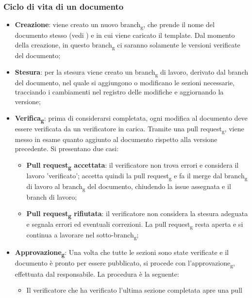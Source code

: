 \subsubsection{Ciclo di vita di un documento}
\begin{itemize}
      \item \textbf{Creazione}: viene creato un nuovo branch\textsubscript{g}, che prende il nome del documento stesso
            (vedi ) e in cui viene caricato il template. Dal momento della creazione, in questo
            branch\textsubscript{g} ci saranno solamente le versioni verificate del documento;
      \item \textbf{Stesura}: per la stesura viene creato un branch\textsubscript{g} di lavoro, derivato dal branch del documento, nel quale si aggiungono o modificano le
            sezioni necessarie, tracciando i cambiamenti nel registro delle modifiche e aggiornando la versione;
      \item \textbf{Verifica\textsubscript{g}}: prima di considerarsi completata, ogni modifica al documento deve essere verificata da un verificatore in carica.
            Tramite una pull request\textsubscript{g}, viene messo in esame quanto aggiunto al documento rispetto alla versione precedente. Si presentano due casi:
            \begin{itemize}
                  \item \textbf{Pull request\textsubscript{g} accettata}: il verificatore non trova errori e considera il lavoro 'verificato';
                   accetta quindi la pull request\textsubscript{g} e fa il merge dal branch\textsubscript{g} di lavoro al branch\textsubscript{g} del documento, chiudendo la issue assegnata e il branch di lavoro;
                  \item \textbf{Pull request\textsubscript{g} rifiutata}: il verificatore non considera la stesura adeguata e segnala errori 
                  ed eventuali correzioni. La pull request\textsubscript{g} resta aperta e si continua a lavorare nel sotto-branch\textsubscript{g};
            \end{itemize}
      \item \textbf{Approvazione\textsubscript{g}}: Una volta che tutte le sezioni sono state verificate e il documento è pronto per essere pubblicato,
            si procede con l'approvazione\textsubscript{g}, effettuata dal responsabile. La procedura è la seguente:
            \begin{itemize}
                  \item Il verificatore che ha verificato l'ultima sezione completata apre una pull

\end{itemize}
\end{itemize}
